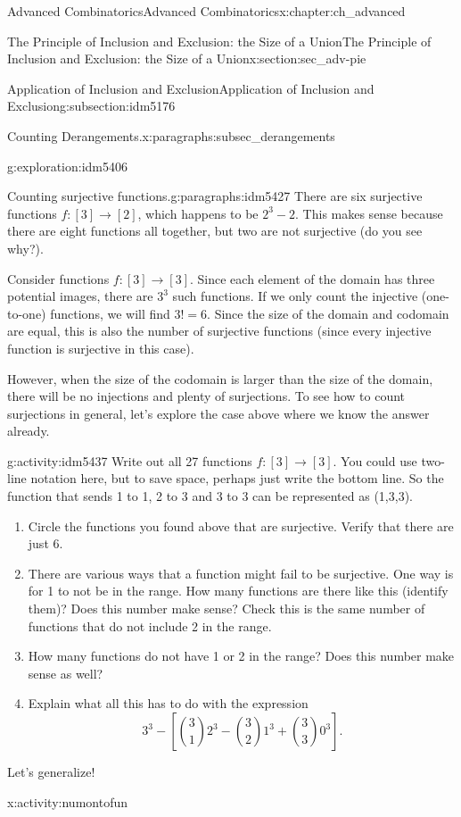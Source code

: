 \documentclass[oneside,10pt,]{book}
\numberwithin{equation}{chapter}
\begin{document}
\begin{chapterptx}{Advanced Combinatorics}{}{Advanced Combinatorics}{}{}{x:chapter:ch_advanced}
\begin{sectionptx}{The Principle of Inclusion and Exclusion: the Size of a Union}{}{The Principle of Inclusion and Exclusion: the Size of a Union}{}{}{x:section:sec_adv-pie}
\begin{subsectionptx}{Application of Inclusion and Exclusion}{}{Application of Inclusion and Exclusion}{}{}{g:subsection:idm5176}
\begin{paragraphs}{Counting Derangements.}{x:paragraphs:subsec_derangements}
\begin{exploration}{}{g:exploration:idm5406}
\end{exploration}
\end{paragraphs}%
\begin{paragraphs}{Counting surjective functions.}{g:paragraphs:idm5427}%
There are six surjective functions  \(f:[3]\to [2]\), which happens to be \(2^3 - 2\).  This makes sense because there are eight functions all together, but two are not surjective (do you see why?).%
\par
Consider functions \(f:[3]\to [3]\).  Since each element of the domain has three potential images, there are \(3^3\) such functions.  If we only count the injective (one-to-one) functions, we will find \(3! = 6\).  Since the size of the domain and codomain are equal, this is also the number of surjective functions (since every injective function is surjective in this case).%
\par
However, when the size of the codomain is larger than the size of the domain, there will be no injections and plenty of surjections.  To see how to count surjections in general, let's explore the case above where we know the answer already.%
\begin{activity}{}{g:activity:idm5437}%
Write out all 27 functions \(f:[3] \to [3]\).  You could use two-line notation here, but to save space, perhaps just write the bottom line.  So the function that sends 1 to 1, 2 to 3 and 3 to 3 can be represented as (1,3,3).\begin{enumerate}[font=\bfseries,label=(\alph*),ref=\alph*]
\item{}Circle the functions you found above that are surjective.  Verify that there are just 6.%
\item{}There are various ways that a function might fail to be surjective.  One way is for 1 to not be in the range.  How many functions are there like this (identify them)?  Does this number make sense?  Check this is the same number of functions that do not include 2 in the range.%
\item{}How many functions do not have 1 or 2 in the range?  Does this number make sense as well?%
\item{}Explain what all this has to do with the expression%
\begin{equation*}
3^3 - \left[ \binom{3}{1}2^3 - \binom{3}{2}1^3 + \binom{3}{3}0^3\right]\text{.}
\end{equation*}
%
\end{enumerate}
\end{activity}
Let's generalize!%
\begin{activity}{}{x:activity:numontofun}%

\end{activity}
\end{paragraphs}
\end{subsectionptx}
\end{sectionptx}
\end{chapterptx}
\end{document}

